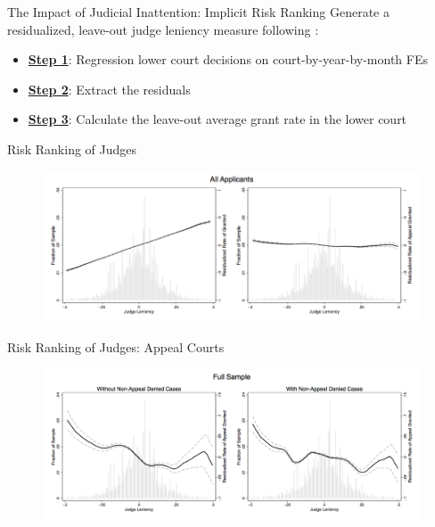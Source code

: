 \begin{frame}{The Impact of Judicial Inattention: Implicit Risk Ranking}
    Generate a residualized, leave-out judge leniency measure following \citet{dobbie2018effects}:
    \begin{itemize}
        \item<2-> \textbf{\color{goldenrod}\underline{Step 1}}: Regression lower court decisions on court-by-year-by-month FEs
        \item<3-> \textbf{\color{goldenrod}\underline{Step 2}}: Extract the residuals
        \item<4-> \textbf{\color{goldenrod}\underline{Step 3}}: Calculate the leave-out average grant rate in the lower court
    \end{itemize}
\end{frame}

\begin{frame}{Risk Ranking of Judges}
    \begin{figure}
        \centering
        \includegraphics[height = 0.7 \textheight]{images/complete_full.png}
    \end{figure}
\end{frame}

\begin{frame}{Risk Ranking of Judges: Appeal Courts}
    \begin{figure}
        \centering
        \includegraphics[height = 0.7 \textheight]{images/stage2comp_full.png}
    \end{figure}
\end{frame}

